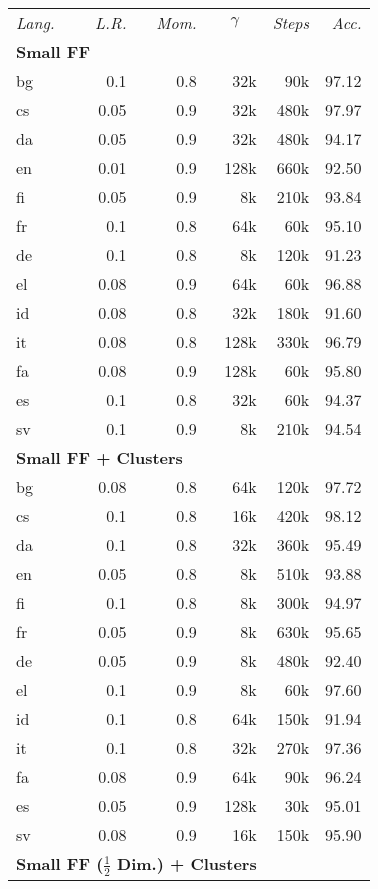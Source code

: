 \documentclass[11pt,letterpaper]{article}
\begin{document}
\begin{table}[htbp]
\begin{tabular}{l|rrrrr}
  \multicolumn{1}{l}{\it Lang.}   & {\it L.R.} & {\it Mom.} & \multicolumn{1}{c}{$\gamma$}  & {\it Steps} & {\it Acc.} \\
\multicolumn{4}{l}{\bf Small FF}  &  &  \\ \hline
bg & 0.1 & 0.8 & 32k & 90k & 97.12 \\
cs & 0.05 & 0.9 & 32k & 480k & 97.97 \\
da & 0.05 & 0.9 & 32k & 480k & 94.17 \\
en & 0.01 & 0.9 & 128k & 660k & 92.50 \\
fi & 0.05 & 0.9 & 8k & 210k & 93.84 \\
fr & 0.1 & 0.8 & 64k & 60k & 95.10 \\
de & 0.1 & 0.8 & 8k & 120k & 91.23 \\
el & 0.08 & 0.9 & 64k & 60k & 96.88 \\
id & 0.08 & 0.8 & 32k & 180k & 91.60 \\
it & 0.08 & 0.8 & 128k & 330k & 96.79 \\
fa & 0.08 & 0.9 & 128k & 60k & 95.80 \\
es & 0.1 & 0.8 & 32k & 60k & 94.37 \\
sv & 0.1 & 0.9 & 8k & 210k & 94.54 \\
\multicolumn{4}{l}{\bf Small FF + Clusters }  &  &  \\ \hline
bg & 0.08 & 0.8 & 64k & 120k & 97.72 \\
cs & 0.1 & 0.8 & 16k & 420k & 98.12 \\
da & 0.1 & 0.8 & 32k & 360k & 95.49 \\
en & 0.05 & 0.8 & 8k & 510k & 93.88 \\
fi & 0.1 & 0.8 & 8k & 300k & 94.97 \\
fr & 0.05 & 0.9 & 8k & 630k & 95.65 \\
de & 0.05 & 0.9 & 8k & 480k & 92.40 \\
el & 0.1 & 0.9 & 8k & 60k & 97.60 \\
id & 0.1 & 0.8 & 64k & 150k & 91.94 \\
it & 0.1 & 0.8 & 32k & 270k & 97.36 \\
fa & 0.08 & 0.9 & 64k & 90k & 96.24 \\
es & 0.05 & 0.9 & 128k & 30k & 95.01 \\
sv & 0.08 & 0.9 & 16k & 150k & 95.90 \\
  \multicolumn{4}{l}{\bf Small FF ($\frac{1}{2}$ Dim.) + Clusters}  &  &  \\ \hline

\end{tabular}
\end{table}
\end{document}
